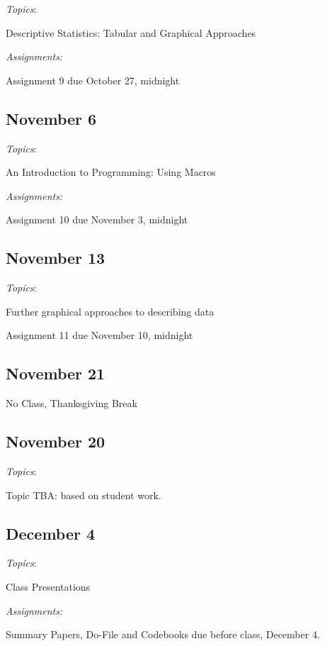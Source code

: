 \documentclass[12pt]{article}
\begin{document}
\begin{flushleft}
\textit{Topics}:

Descriptive Statistics: Tabular and Graphical Approaches

\textit {Assignments:}

Assignment 9 due October 27, midnight

\subsection{November 6}

\textit{Topics}:

An Introduction to Programming: Using Macros

\textit {Assignments:}

Assignment 10 due November 3, midnight

\subsection{November 13}

\textit{Topics}:

Further graphical approaches to describing data 

Assignment 11 due November 10, midnight

\subsection{November 21}

No Class, Thanksgiving Break


\subsection{November 20}


\textit{Topics}:

Topic TBA: based on student work. 


\subsection{December 4}

\textit{Topics}:

Class Presentations

\textit {Assignments:}

Summary Papers, Do-File and Codebooks due before class, December 4. 


\end{flushleft}
\end{document}
